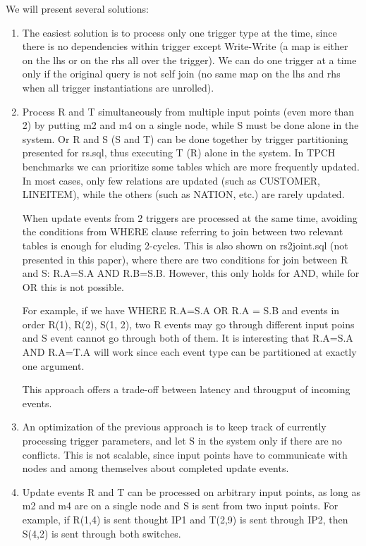 \documentclass{sig-semester}
\begin{document}
We will present several solutions:
\begin{enumerate}
\item The easiest solution is to process only one trigger type at the time, since there is no dependencies within trigger except Write-Write (a map is either on the lhs or on the rhs all over the trigger). We can do one trigger at a time only if the original query is not self join (no same map on the lhs and rhs when all trigger instantiations are unrolled).
\item Process R and T simultaneously from multiple input points (even more than 2) by putting m2 and m4 on a single node, while S must be done alone in the system. Or R and S (S and T) can be done together by trigger partitioning presented for rs.sql, thus executing T (R) alone in the system. In TPCH benchmarks we can prioritize some tables which are more frequently updated. In most cases, only few relations are updated (such as CUSTOMER, LINEITEM), while the others (such as NATION, etc.) are rarely updated.

When update events from 2 triggers are processed at the same time, avoiding the conditions from WHERE clause referring to join between two relevant tables is enough for eluding 2-cycles. This is also shown on rs2joint.sql (not presented in this paper), where there are two conditions for join between R and S: R.A=S.A AND R.B=S.B. However, this only holds for AND, while for OR this is not possible.

For example, if we have WHERE R.A=S.A OR R.A = S.B and events in order R(1), R(2), S(1, 2), two R events may go through different input poins and S event cannot go through both of them. It is interesting that R.A=S.A AND R.A=T.A will work since each event type can be partitioned at exactly one argument.

This approach offers a trade-off between latency and througput of incoming events.

\item An optimization of the previous approach is to keep track of currently processing trigger parameters, and let S in the system only if there are no conflicts. This is not scalable, since input points have to communicate with nodes and among themselves about completed update events.
\item Update events R and T can be processed on arbitrary input points, as long as m2 and m4 are on a single node and S is sent from two input points. For example, if R(1,4) is sent thought IP1 and T(2,9) is sent through IP2, then S(4,2) is sent through both switches.


\end{enumerate}
\end{document}
